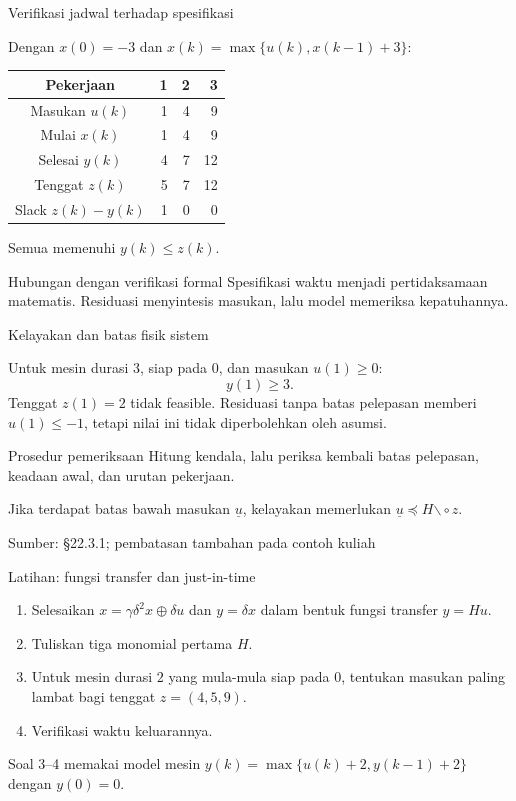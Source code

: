 \documentclass[aspectratio=169,11pt]{beamer}
\newcommand{\source}[1]{%
    \vfill
    \hfill{\tiny\color{gray}Sumber: #1}
}
\newcommand{\res}{\mathbin{\backslash\!\circ}}
\begin{document}
\begin{frame}{Verifikasi jadwal terhadap spesifikasi}


Dengan $x(0)=-3$ dan $x(k)=\max\{u(k),x(k-1)+3\}$:
\begin{center}\begin{tabular}{c|rrr}\toprule
Pekerjaan&1&2&3\\\midrule
Masukan $u(k)$&1&4&9\\
Mulai $x(k)$&1&4&9\\
Selesai $y(k)$&4&7&12\\
Tenggat $z(k)$&5&7&12\\
Slack $z(k)-y(k)$&1&0&0\\\bottomrule
\end{tabular}\end{center}
Semua memenuhi $y(k)\le z(k)$.
\begin{block}{Hubungan dengan verifikasi formal}
Spesifikasi waktu menjadi pertidaksamaan matematis.
Residuasi menyintesis masukan, lalu model memeriksa kepatuhannya.
\end{block}


\end{frame}
\begin{frame}{Kelayakan dan batas fisik sistem}

Untuk mesin durasi $3$, siap pada $0$, dan masukan $u(1)\ge0$:
\[
y(1)\ge3.
\]
Tenggat $z(1)=2$ tidak feasible.
Residuasi tanpa batas pelepasan memberi $u(1)\le-1$,
tetapi nilai ini tidak diperbolehkan oleh asumsi.
\begin{block}{Prosedur pemeriksaan}
Hitung kendala, lalu periksa kembali batas pelepasan,
keadaan awal, dan urutan pekerjaan.
\end{block}
Jika terdapat batas bawah masukan $\underline u$, kelayakan memerlukan
$\underline u\preceq H\res z$.

\source{\S22.3.1; pembatasan tambahan pada contoh kuliah}
\end{frame}
\begin{frame}{Latihan: fungsi transfer dan just-in-time}


\begin{enumerate}
\item Selesaikan $x=\gamma\delta^2x\oplus\delta u$ dan $y=\delta x$
dalam bentuk fungsi transfer $y=Hu$.
\item Tuliskan tiga monomial pertama $H$.
\item Untuk mesin durasi $2$ yang mula-mula siap pada $0$,
tentukan masukan paling lambat bagi tenggat $z=(4,5,9)$.
\item Verifikasi waktu keluarannya.
\end{enumerate}
Soal 3--4 memakai model mesin $y(k)=\max\{u(k)+2,y(k-1)+2\}$
dengan $y(0)=0$.
 


\end{frame}
\end{document}
